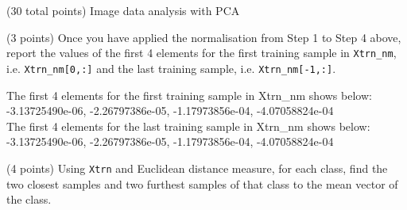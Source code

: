 \documentclass[12pt]{article}
\begin{document}
\clearpage
%
%

\begin{question}{(30 total points) Image data analysis with PCA}

  
  

  
  \medskip

  \begin{subquestion}{(3 points)
      Once you have applied the normalisation from Step 1 to Step 4 above,
      report the values of the first 4 elements for the first training
      sample in \texttt{Xtrn\_nm},
      i.e. \texttt{Xtrn\_nm[0,:]} and the last training sample,
      i.e. \texttt{Xtrn\_nm[-1,:]}.
    } \label{Q1.1}
    

      \begin{answerbox}{10em}
         The first 4 elements for the first training sample in Xtrn\_nm shows below:\\
         -3.13725490e-06, -2.26797386e-05, -1.17973856e-04, -4.07058824e-04\\
         The first 4 elements for the last training sample in Xtrn\_nm shows below:\\
         -3.13725490e-06, -2.26797386e-05, -1.17973856e-04, -4.07058824e-04
      \end{answerbox}
  


   \end{subquestion}
   \begin{subquestion}{(4 points)
      Using {\tt Xtrn} and Euclidean distance
      measure, for each class,
      find the two closest samples and two furthest
      samples of that class to the mean vector of the class.
    }  \label{Q1.2}





\end{subquestion}
\end{question}
\end{document}
